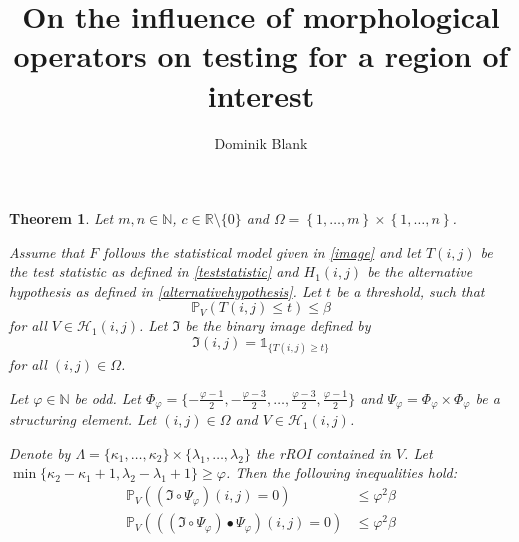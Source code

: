 \documentclass[a4paper,12pt]{article}
\author{Dominik Blank}
\title{On the influence of morphological operators on testing for a region of interest}
\theoremstyle{plain}
\newtheorem{theorem}{Theorem}[section]
\theoremstyle{definition}
\begin{document}
\begin{theorem}
	Let $m, n \in \mathbb{N}$, $c \in \mathbb{R} \setminus \{ 0 \}$ and $\Omega = \left\{ 1, \dots, m \right\} \times \left\{ 1, \dots, n \right\}$.
	
	Assume that $F$ follows the statistical model given in \eqref{image} and let $T(i, j)$ be the test statistic as defined in \eqref{teststatistic} and $H_1(i, j)$ be the alternative hypothesis as defined in \eqref{alternativehypothesis}. Let $t$ be a threshold, such that
	\begin{equation*}
		\mathbb{P}_V\left( T(i, j) \leq t \right) \leq \beta
	\end{equation*}
	for all $V \in \mathcal{H}_1(i, j)$. Let $\mathfrak{I}$ be the binary image defined by
	\begin{equation}
		\mathfrak{I}(i, j) = \mathds{1}_{ \{ T(i, j) \geq t \} }
	\end{equation}
	for all $(i, j) \in \Omega$.
	
	Let $\varphi \in \mathbb{N}$ be odd. Let $\Phi_\varphi = \{ -\frac{\varphi - 1}{2}, -\frac{\varphi - 3}{2}, \dots, \frac{\varphi - 3}{2}, \frac{\varphi - 1}{2} \}$ and $\Psi_\varphi = \Phi_\varphi \times \Phi_\varphi$ be a structuring element. Let $(i, j) \in \Omega$ and $V \in \mathcal{H}_1(i, j)$.
	
	Denote by $\varLambda = \{ \kappa_1, \dots, \kappa_2 \} \times \{ \lambda_1, \dots, \lambda_2 \}$ the rROI contained in $V$. Let $\min \{ \kappa_2 - \kappa_1 + 1, \lambda_2 - \lambda_1 + 1 \} \geq \varphi$.
	Then the following inequalities hold:
	\begin{align}
		\mathbb{P}_V( (\mathfrak{I} \circ \Psi_\varphi)(i, j) = 0 ) &\leq \varphi^2 \beta \label{ineqtypeIIopening} \\
		\mathbb{P}_V( ((\mathfrak{I} \circ \Psi_\varphi) \bullet \Psi_\varphi)(i, j) = 0 ) &\leq \varphi^2 \beta \label{ineqtypeIIclosing}
	\end{align}
\end{theorem}
\end{document}
